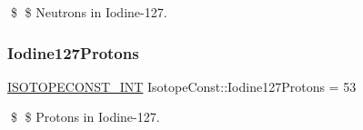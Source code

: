 \$ \$ Neutrons in Iodine-\/127. \mbox{\label{group___isotope_const-_iodine-_i127_ga355872e125a067c0936ee11d31ea97fd}} 
\subsubsection{\texorpdfstring{Iodine127\+Protons}{Iodine127Protons}}
{\footnotesize\ttfamily \mbox{\hyperlink{group___isotope_const-_macros_ga5f18360b3e99483a35c32d789e62621c}{I\+S\+O\+T\+O\+P\+E\+C\+O\+N\+S\+T\+\_\+\+I\+NT}} Isotope\+Const\+::\+Iodine127\+Protons = 53}

\$ \$ Protons in Iodine-\/127. 